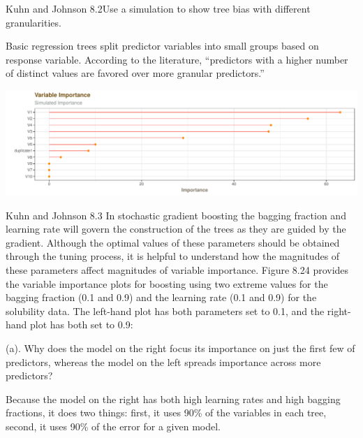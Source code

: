 \documentclass[]{report}
\begin{document}

\begin{question}{Kuhn and Johnson 8.2}Use a simulation to show tree bias with different granularities.\end{question}

Basic regression trees split predictor variables into small groups based
on response variable. According to the literature, ``predictors with a
higher number of distinct values are favored over more granular
predictors.''

\includegraphics{AppliedPredictiveModeling_treebased_regression_files/figure-latex/kj-8.2-1.pdf}


\begin{question}{Kuhn and Johnson 8.3} In stochastic gradient boosting the bagging fraction and learning rate will govern the construction of the trees as they are guided by the gradient. Although the optimal values of these parameters should be obtained through the tuning process, it is helpful to understand how the magnitudes of these parameters affect magnitudes of variable importance. Figure 8.24 provides the variable importance plots for boosting using two extreme values for the bagging fraction (0.1 and 0.9) and the learning rate (0.1 and 0.9) for the solubility data. The left-hand plot has both parameters set to 0.1, and the right-hand plot has both set to 0.9: \end{question}

\begin{subquestion}{(a).} Why does the model on the right focus its importance on just the first few of predictors, whereas the model on the left spreads importance across more predictors? \end{subquestion}

Because the model on the right has both high learning rates and high
bagging fractions, it does two things: first, it uses 90\% of the
variables in each tree, second, it uses 90\% of the error for a given
model.
\end{document}
